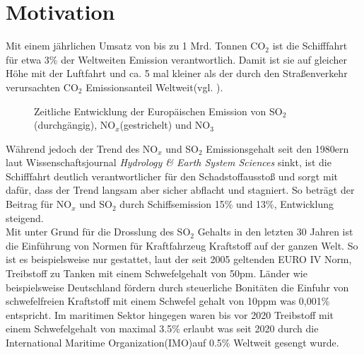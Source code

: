 \section{Motivation}
Mit einem jährlichen Umsatz von bis zu 1 Mrd. Tonnen CO$_{2}$ ist die Schifffahrt für etwa 3\% der Weltweiten Emission verantwortlich. Damit ist sie auf gleicher Höhe mit der Luftfahrt und ca. 5 mal kleiner als der durch den Straßenverkehr verursachten CO$_{2}$ Emissionsanteil Weltweit(vgl. \cite[S. 584]{EnergyPolicy.2016a}).
\begin{figure}[H]
\centering
{}
\caption{\label{fig-firmenHQ}Zeitliche Entwicklung der Europäischen Emission von SO$_{2}$(durchgängig), NO$_{x}$(gestrichelt) und NO$_{3}$}
\end{figure}
Während jedoch der Trend des NO$_{x}$ und SO$_{2}$ Emissionsgehalt seit den 1980ern laut Wissenschaftsjournal \textit{Hydrology \& Earth System Sciences} sinkt\cite{HandE.2003a}, ist die Schifffahrt deutlich verantwortlicher für den Schadstoffausstoß und sorgt mit dafür, dass der Trend langsam aber sicher abflacht und stagniert. So beträgt der Beitrag für NO$_{x}$ und SO$_{2}$ durch Schiffsemission 15\% und 13\%, Entwicklung steigend.\\Mit unter Grund für die Drosslung des SO$_{2}$ Gehalts in den letzten 30 Jahren ist die Einführung von Normen für Kraftfahrzeug Kraftstoff auf der ganzen Welt. So ist es beispielsweise nur gestattet, laut der seit 2005 geltenden EURO IV Norm, Treibstoff zu Tanken mit einem Schwefelgehalt von 50pm\cite{Kfz_Auskunft}. Länder wie beispielsweise Deutschland fördern durch steuerliche Bonitäten die Einfuhr von schwefelfreien Kraftstoff mit einem Schwefel gehalt von 10ppm was 0,001\% entspricht\cite{Zoll}. Im maritimen Sektor hingegen waren bis vor 2020 Treibstoff mit einem Schwefelgehalt von maximal 3.5\% erlaubt was seit 2020 durch die International Maritime Organization(IMO)auf 0.5\% Weltweit gesengt wurde.
